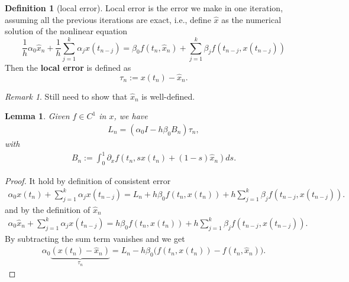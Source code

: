 \documentclass[a4paper,12pt,oneside,fleqn]{book}
\newtheorem{lemma}[theorem]{Lemma}
\theoremstyle{definition}
\newtheorem{definition}{Definition}[section]
\theoremstyle{remark}
\newtheorem*{remark}{Remark}
\begin{document}
\begin{definition}[local error]
	Local error is the error we make in one iteration, assuming all the previous iterations are exact, i.e., 
	define $\hat{x}$ as the numerical solution of the nonlinear equation
	\begin{equation}
		\frac{1}{h} \alpha_0 \hat{x}_n + \frac{1}{h} \sum_{j = 1}^k \alpha_j x(t_{n - j}) = \beta_0 f(t_n, \hat{x}_n) + \sum_{j = 1}^k \beta_j f(t_{n -j}, x(t_{n - j}))
	\end{equation}
	Then the \textbf{local error} is defined as 
	\begin{equation}
		\tau_n := x(t_n) - \hat{x}_n.
	\end{equation}
\end{definition}
\begin{remark}
Still need to show that $\hat{x}_n$ is well-defined. 	
\end{remark}


\begin{lemma}
	Given $f \in C^1$ in $x$, we have
	\begin{align*}
		L_n = (\alpha_0 I - h \beta_0 B_n) \tau_n,
	\end{align*}
	with
	\begin{align*}
		B_n:=  \int_0^1 \partial_xf (t_n, sx(t_n) + (1 -s) \hat{x}_n) ds. 
	\end{align*}
\end{lemma}
\begin{proof}
	It hold by definition of consistent error
	\begin{align*}
		\alpha_0 x(t_n) + \sum_{j = 1}^k \alpha_j x(t_{n - j})= L_n + h\beta_0 f(t_n, x(t_n)) + h\sum_{j = 1}^k \beta_j f(t_{n -j}, x(t_{n -j})). 
	\end{align*}
	and by the definition of $\hat{x}_n$
	\begin{align*}
		\alpha_0\hat{x}_n + \sum_{j = 1}^k \alpha_j x(t_{n - j}) = h\beta_0 f(t_n, x(t_n)) + h \sum_{j = 1}^k \beta_j f(t_{n -j}, x(t_{n - j})). 
	\end{align*}
	By subtracting the sum term vanishes and we get
	\begin{align*}
		\alpha_0 \underbrace{ (x(t_n) - \hat{x}_n)}_{\tau_n} = L_n - h\beta_0\bigg( f(t_n, x(t_n)) - f(t_n, \hat{x}_n)\bigg). 
	\end{align*}
\end{proof}
\end{document}
